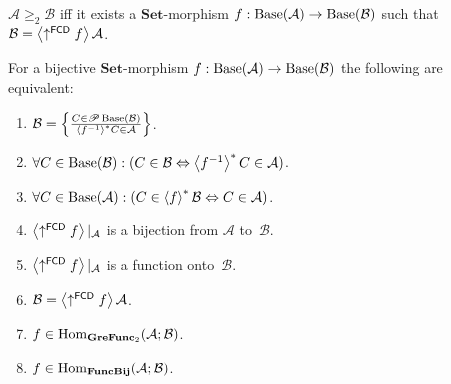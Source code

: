 \begin{cor}
$\mathcal{A}\ge_{2}\mathcal{B}$ iff it exists a $\mathbf{Set}$-morphism
$f:\operatorname{Base}(\mathcal{A})\rightarrow\operatorname{Base}(\mathcal{B})$ such that $\mathcal{B}=\left\langle \uparrow^{\mathsf{FCD}}f\right\rangle\mathcal{A}$.\end{cor}
\begin{prop}
For a bijective $\mathbf{Set}$-morphism $f:\operatorname{Base}(\mathcal{A})\rightarrow\operatorname{Base}(\mathcal{B})$
the following are equivalent:
\begin{enumerate}
\item \label{fbij-star}$\mathcal{B}=\left\{ \frac{C\in\mathscr{P}\operatorname{Base}(\mathcal{B})}{\left\langle f^{-1}\right\rangle ^{\ast}C\in\mathcal{A}}\right\}$.
\item \label{fbij-eback}$\forall C\in\operatorname{Base}(\mathcal{B}):(C\in\mathcal{B}\Leftrightarrow\left\langle f^{-1}\right\rangle ^{\ast}C\in\mathcal{A})$.
\item \label{fbij-eforw}$\forall C\in\operatorname{Base}(\mathcal{A}):(C\in\left\langle f\right\rangle ^{\ast}\mathcal{B}\Leftrightarrow C\in\mathcal{A})$.
\item \label{fbij-rbij}$\left\langle \uparrow^{\mathsf{FCD}}f\right\rangle|_{\mathcal{A}}$
is a bijection from $\mathcal{A}$ to~$\mathcal{B}$.
\item \label{fbij-rsurj}$\left\langle \uparrow^{\mathsf{FCD}}f\right\rangle|_{\mathcal{A}}$
is a function onto~$\mathcal{B}$.
\item \label{fbij-feq}$\mathcal{B}=\left\langle \uparrow^{\mathsf{FCD}}f\right\rangle\mathcal{A}$.
\item \label{fbij-gre}$f\in\operatorname{Hom}_{\mathbf{GreFunc}_{2}}(\mathcal{A};\mathcal{B})$.
\item \label{fbij-grp}$f\in\operatorname{Hom}_{\mathbf{FuncBij}}(\mathcal{A};\mathcal{B})$.
\end{enumerate}
\end{prop}
